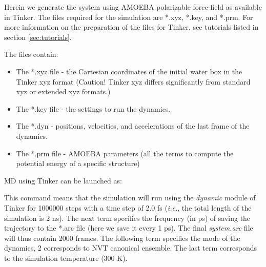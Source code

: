 \documentclass[12pt]{article}
\begin{document}
Herein we generate the system using AMOEBA polarizable force-field as available in Tinker. The files required for the simulation are *.xyz,  *.key, and *.prm. For more information on the preparation of the files for Tinker, see tutorials listed in section \ref{sec:tutorials}.

The files contain:

\begin{itemize}
    \item The *.xyz file - the Cartesian coordinates of the initial water box in the Tinker xyz format (Caution! Tinker xyz differs significantly from standard xyz or extended xyz formats.)  
    \item The *.key file - the settings to run the dynamics.
    \item The *.dyn - positions, velocities, and accelerations of the last frame of the dynamics.
    \item The *.prm file - AMOEBA parameters (all the terms to compute the potential energy of a specific structure)
\end{itemize}

MD using Tinker can be launched as:
\begin{center}
\end{center}

This command means that the simulation will run using the \textit{dynamic} module of Tinker for 1000000 steps with a time step of 2.0 fs (\textit{i.e.}, the total length of the simulation is 2 ns). The next term specifies the frequency (in ps) of saving the trajectory to the *.arc file (here we save it every 1 ps). The final \textit{system.arc} file will thus contain 2000 frames. The following term specifies the mode of the dynamics, 2 corresponds to NVT canonical ensemble. The last term corresponds to the simulation temperature (300 K). 
\end{document}

